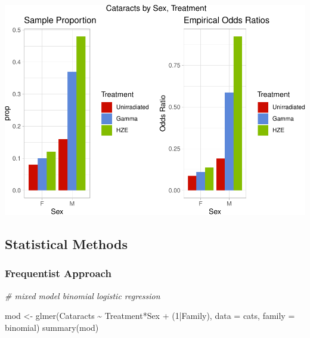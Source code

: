 \documentclass[
]{article}
\newenvironment{Shaded}{\begin{snugshade}}{\end{snugshade}}
\newcommand{\AttributeTok}[1]{\textcolor[rgb]{0.77,0.63,0.00}{#1}}
\newcommand{\CommentTok}[1]{\textcolor[rgb]{0.56,0.35,0.01}{\textit{#1}}}
\newcommand{\DecValTok}[1]{\textcolor[rgb]{0.00,0.00,0.81}{#1}}
\newcommand{\FunctionTok}[1]{\textcolor[rgb]{0.00,0.00,0.00}{#1}}
\newcommand{\NormalTok}[1]{#1}
\newcommand{\OtherTok}[1]{\textcolor[rgb]{0.56,0.35,0.01}{#1}}
\newcommand{\SpecialCharTok}[1]{\textcolor[rgb]{0.00,0.00,0.00}{#1}}
\begin{document}
\includegraphics{final_report_files/figure-latex/barplot-1.pdf}

\hypertarget{statistical-methods}{%
\subsection{Statistical Methods}\label{statistical-methods}}

\hypertarget{frequentist-approach}{%
\subsubsection{Frequentist Approach}\label{frequentist-approach}}

\begin{Shaded}
\begin{Highlighting}[]
\CommentTok{\# mixed model binomial logistic regression }

\NormalTok{mod }\OtherTok{\textless{}{-}} \FunctionTok{glmer}\NormalTok{(Cataracts }\SpecialCharTok{\textasciitilde{}}\NormalTok{ Treatment}\SpecialCharTok{*}\NormalTok{Sex }\SpecialCharTok{+}\NormalTok{ (}\DecValTok{1}\SpecialCharTok{|}\NormalTok{Family), }\AttributeTok{data =}\NormalTok{ cats, }\AttributeTok{family =}\NormalTok{ binomial)}
\FunctionTok{summary}\NormalTok{(mod)}
\end{Highlighting}
\end{Shaded}
\end{document}

